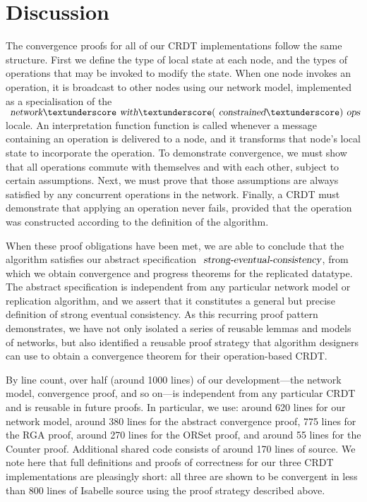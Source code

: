 \documentclass[acmlarge,review,anonymous]{acmart}
\begin{document}
\section{Discussion}
\label{sect.discussion}

The convergence proofs for all of our CRDT implementations follow the same structure.
First we define the type of local state at each node, and the types of operations that may be invoked to modify the state.
When one node invokes an operation, it is broadcast to other nodes using our network model, implemented as a specialisation of the $\isa{network}{\isacharunderscore}\isa{with}{\isacharunderscore}(\isa{constrained}{\isacharunderscore})\isa{ops}$ locale.
An interpretation function function is called whenever a message containing an operation is delivered to a node, and it transforms that node's local state to incorporate the operation.
To demonstrate convergence, we must show that all operations commute with themselves and with each other, subject to certain assumptions.
Next, we must prove that those assumptions are always satisfied by any concurrent operations in the network.
Finally, a CRDT must demonstrate that applying an operation never fails, provided that the operation was constructed according to the definition of the algorithm.

When these proof obligations have been met, we are able to conclude that the algorithm satisfies our abstract specification $\isa{strong-eventual-consistency}$, from which we obtain convergence and progress theorems for the replicated datatype.
The abstract specification is independent from any particular network model or replication algorithm, and we assert that it constitutes a general but precise definition of strong eventual consistency.
As this recurring proof pattern demonstrates, we have not only isolated a series of reusable lemmas and models of networks, but also identified a reusable proof strategy that algorithm designers can use to obtain a convergence theorem for their operation-based CRDT.

By line count, over half (around 1000 lines) of our development---the network model, convergence proof, and so on---is independent from any particular CRDT and is reusable in future proofs.
In particular, we use: around 620 lines for our network model, around 380 lines for the abstract convergence proof, 775 lines for the RGA proof, around 270 lines for the ORSet proof, and around 55 lines for the Counter proof.
Additional shared code consists of around 170 lines of source.
We note here that full definitions and proofs of correctness for our three CRDT implementations are pleasingly short: all three are shown to be convergent in less than 800 lines of Isabelle source using the proof strategy described above. 
\end{document}
